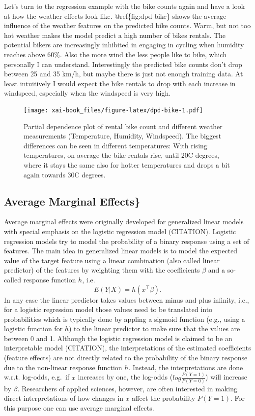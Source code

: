 \documentclass[12pt,]{krantz}
\theoremstyle{definition}
\theoremstyle{definition}
\theoremstyle{definition}
\theoremstyle{remark}
\begin{document}
Let's turn to the regression example with the bike counts again and have
a look at how the weather effects look like. @ref\{fig:dpd-bike\} shows
the average influence of the weather features on the predicted bike
counts. Warm, but not too hot weather makes the model predict a high
number of bikes rentals. The potential bikers are increasingly inhibited
in engaging in cycling when humidity reaches above 60\%. Also the more
wind the less people like to bike, which personally I can understand.
Interestingly the predicted bike counts don't drop between 25 and 35
km/h, but maybe there is just not enough training data. At least
intuitively I would expect the bike rentals to drop with each increase
in windspeed, especially when the windspeed is very high.

\begin{figure}
\centering
\texttt{[image: xai-book\_files/figure-latex/dpd-bike-1.pdf]}
\caption{\label{fig:dpd-bike}Partial dependence plot of rental bike count
and different weather measurements (Temperature, Humidity, Windspeed).
The biggest differences can be seen in different temperatures: With
rising temperatures, on average the bike rentals rise, until 20C
degrees, where it stays the same also for hotter temperatures and drops
a bit again towards 30C degrees.}
\end{figure}

\subsection{Average Marginal Effects\}}\label{average-marginal-effects}

Average marginal effects were originally developed for generalized
linear models with special emphasis on the logistic regression model
(CITATION). Logistic regression models try to model the probability of a
binary response using a set of features. The main idea in generalized
linear models is to model the expected value of the target feature using
a linear combination (also called linear predictor) of the features by
weighting them with the coefficients \(\beta\) and a so-called response
function \(h\), i.e. \[E(Y|X) = h(x^\top \beta).\] In any case the
linear predictor takes values between minus and plus infinity, i.e., for
a logistic regression model those values need to be translated into
probabilities which is typically done by appling a sigmoid function
(e.g., using a logistic function for \(h\)) to the linear predictor to
make sure that the values are between 0 and 1. Although the logistic
regression model is claimed to be an interpretable model (CITATION), the
interpretations of the estimated coefficients (feature effects) are not
directly related to the probability of the binary response due to the
non-linear response function \(h\). Instead, the interpretations are
done w.r.t. log-odds, e.g.~if \(x\) increases by one, the log-odds
(\(log \frac{P(Y = 1)}{P(Y = 0)}\)) will increase by \(\beta\).
Researchers of applied sciences, however, are often interested in making
direct interpretations of how changes in \(x\) affect the probability
\(P(Y=1)\). For this purpose one can use average marginal effects.
\end{document}
